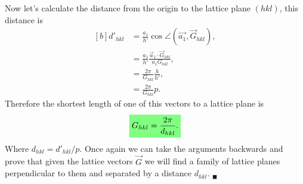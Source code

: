 \begin{questions}
\begin{solution}
  Now let's calculate the distance from the origin to the lattice plane $(hkl)$, this distance is
  \begin{equation}
    \begin{aligned}[b]
      d'_{hkl} &= \frac{a_1}{h'}\cos \angle(\vec{a_1}, \vec{G}_{hkl}),\\
      &= \frac{a_1}{h'}\frac{\vec{a}_1\cdot \vec{G}_{hkl}}{a_1G_{hkl}},\\
      &= \frac{2\pi}{G_{hkl}}\frac{h}{h'},\\
      &= \frac{2\pi}{G_{hkl}}p.
  \end{aligned}
  \end{equation}
  Therefore the shortest length of one of this vectors to a lattice plane is
  \begin{equation}
    \hlgreen{G_{hkl} =\frac{2\pi}{d_{hkl}}.}
  \end{equation}
  Where $d_{hkl} = d'_{hkl}/p$. Once again we can take the arguments backwards and prove that given the lattice vectors $\vec{G}$ we will find a family of lattice planes perpendicular to them and separated by a distance $d_{hkl}$. $_\blacksquare$
\end{solution}
\end{questions}

%
%
